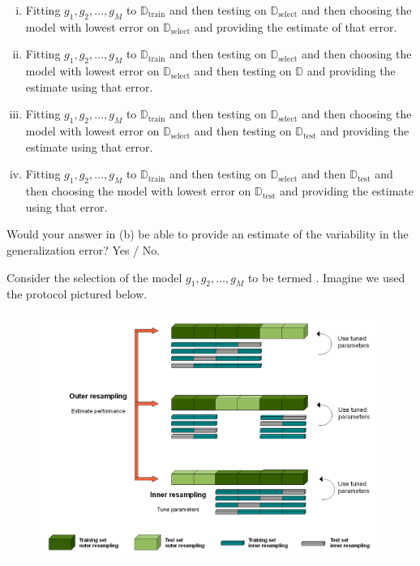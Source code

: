 \documentclass[12pt]{article}
\begin{document}
\begin{enumerate}[i)]
\item Fitting $g_1, g_2, \ldots, g_M$ to $\mathbb{D}_{\text{train}}$ and then testing on $\mathbb{D}_{\text{select}}$ and then choosing the model with lowest error on $\mathbb{D}_{\text{select}}$ and providing the estimate of that error.
\item Fitting $g_1, g_2, \ldots, g_M$ to $\mathbb{D}_{\text{train}}$ and then testing on $\mathbb{D}_{\text{select}}$ and then choosing the model with lowest error on $\mathbb{D}_{\text{select}}$ and then testing on $\mathbb{D}$ and providing the estimate using that error.
\item Fitting $g_1, g_2, \ldots, g_M$ to $\mathbb{D}_{\text{train}}$ and then testing on $\mathbb{D}_{\text{select}}$ and then choosing the model with lowest error on $\mathbb{D}_{\text{select}}$ and then testing on $\mathbb{D}_{\text{test}}$ and providing the estimate using that error.
\item Fitting $g_1, g_2, \ldots, g_M$ to $\mathbb{D}_{\text{train}}$ and then testing on $\mathbb{D}_{\text{select}}$ and then $\mathbb{D}_{\text{test}}$ and then choosing the model with lowest error on $\mathbb{D}_{\text{test}}$ and providing the estimate using that error.
\end{enumerate}

 Would your answer in (b) be able to provide an estimate of the variability in the generalization error? Yes / No.

Consider the selection of the model $g_1, g_2, \ldots, g_M$ to be termed . Imagine we used the protocol pictured below.

\begin{figure}[htp]
\centering
\includegraphics[width=6in]{nested_resampling.png}
\end{figure}
\end{document}
